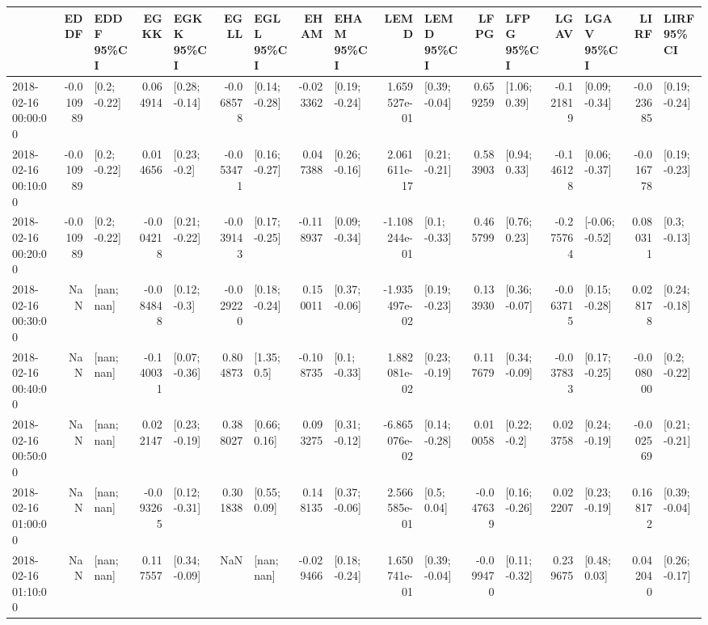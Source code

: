 \begin{tabular}{lrlrlrlrlrlrlrlrl}
\toprule
{} &      EDDF &      EDDF 95\%CI &      EGKK &      EGKK 95\%CI &      EGLL &      EGLL 95\%CI &      EHAM &      EHAM 95\%CI &          LEMD &      LEMD 95\%CI &      LFPG &      LFPG 95\%CI &      LGAV &      LGAV 95\%CI &      LIRF &      LIRF 95\%CI \\
\midrule
2018-02-16 00:00:00 & -0.010989 &    [0.2; -0.22] &  0.064914 &   [0.28; -0.14] & -0.068578 &   [0.14; -0.28] & -0.023362 &   [0.19; -0.24] &  1.659527e-01 &   [0.39; -0.04] &  0.659259 &    [1.06; 0.39] & -0.121819 &   [0.09; -0.34] & -0.023685 &   [0.19; -0.24] \\
2018-02-16 00:10:00 & -0.010989 &    [0.2; -0.22] &  0.014656 &    [0.23; -0.2] & -0.053471 &   [0.16; -0.27] &  0.047388 &   [0.26; -0.16] &  2.061611e-17 &   [0.21; -0.21] &  0.583903 &    [0.94; 0.33] & -0.146128 &   [0.06; -0.37] & -0.016778 &   [0.19; -0.23] \\
2018-02-16 00:20:00 & -0.010989 &    [0.2; -0.22] & -0.004218 &   [0.21; -0.22] & -0.039143 &   [0.17; -0.25] & -0.118937 &   [0.09; -0.34] & -1.108244e-01 &    [0.1; -0.33] &  0.465799 &    [0.76; 0.23] & -0.275764 &  [-0.06; -0.52] &  0.080311 &    [0.3; -0.13] \\
2018-02-16 00:30:00 &       NaN &      [nan; nan] & -0.084848 &    [0.12; -0.3] & -0.029220 &   [0.18; -0.24] &  0.150011 &   [0.37; -0.06] & -1.935497e-02 &   [0.19; -0.23] &  0.133930 &   [0.36; -0.07] & -0.063715 &   [0.15; -0.28] &  0.028178 &   [0.24; -0.18] \\
2018-02-16 00:40:00 &       NaN &      [nan; nan] & -0.140031 &   [0.07; -0.36] &  0.804873 &     [1.35; 0.5] & -0.108735 &    [0.1; -0.33] &  1.882081e-02 &   [0.23; -0.19] &  0.117679 &   [0.34; -0.09] & -0.037833 &   [0.17; -0.25] & -0.008000 &    [0.2; -0.22] \\
2018-02-16 00:50:00 &       NaN &      [nan; nan] &  0.022147 &   [0.23; -0.19] &  0.388027 &    [0.66; 0.16] &  0.093275 &   [0.31; -0.12] & -6.865076e-02 &   [0.14; -0.28] &  0.010058 &    [0.22; -0.2] &  0.023758 &   [0.24; -0.19] & -0.002569 &   [0.21; -0.21] \\
2018-02-16 01:00:00 &       NaN &      [nan; nan] & -0.093265 &   [0.12; -0.31] &  0.301838 &    [0.55; 0.09] &  0.148135 &   [0.37; -0.06] &  2.566585e-01 &     [0.5; 0.04] & -0.047639 &   [0.16; -0.26] &  0.022207 &   [0.23; -0.19] &  0.168172 &   [0.39; -0.04] \\
2018-02-16 01:10:00 &       NaN &      [nan; nan] &  0.117557 &   [0.34; -0.09] &       NaN &      [nan; nan] & -0.029466 &   [0.18; -0.24] &  1.650741e-01 &   [0.39; -0.04] & -0.099470 &   [0.11; -0.32] &  0.239675 &    [0.48; 0.03] &  0.042040 &   [0.26; -0.17] \\

\end{tabular}
